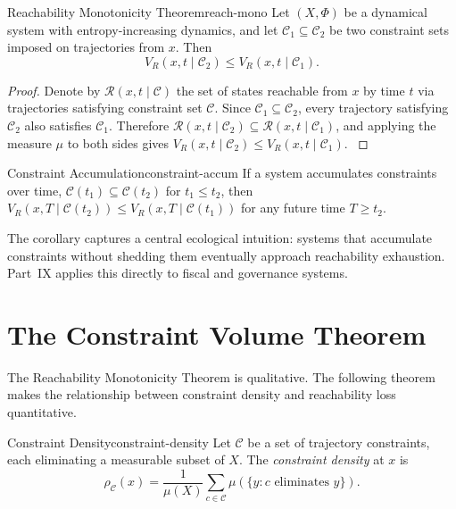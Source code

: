 \documentclass[12pt,twoside,openright]{book}
\newcommand{\reach}{\mathcal{R}}
\begin{document}
\begin{theorem}{Reachability Monotonicity Theorem}{reach-mono}
  Let $(X,\Phi)$ be a dynamical system with
  entropy-increasing dynamics, and let
  $\mathcal{C}_1\subseteq\mathcal{C}_2$ be two constraint
  sets imposed on trajectories from $x$. Then
  \[
    V_R(x,t\mid\mathcal{C}_2) \le V_R(x,t\mid\mathcal{C}_1).
  \]
\end{theorem}

\begin{proof}
  Denote by $\reach(x,t\mid\mathcal{C})$ the set of states
  reachable from $x$ by time $t$ via trajectories satisfying
  constraint set $\mathcal{C}$. Since
  $\mathcal{C}_1\subseteq\mathcal{C}_2$, every trajectory
  satisfying $\mathcal{C}_2$ also satisfies $\mathcal{C}_1$.
  Therefore
  $\reach(x,t\mid\mathcal{C}_2) \subseteq \reach(x,t\mid\mathcal{C}_1)$,
  and applying the measure $\mu$ to both sides gives
  $V_R(x,t\mid\mathcal{C}_2) \le V_R(x,t\mid\mathcal{C}_1)$.
  \parencite{sontag1998}
\end{proof}

\begin{corollary}{Constraint Accumulation}{constraint-accum}
  If a system accumulates constraints over time,
  $\mathcal{C}(t_1)\subseteq\mathcal{C}(t_2)$ for
  $t_1\le t_2$, then
  $V_R(x,T\mid\mathcal{C}(t_2)) \le V_R(x,T\mid\mathcal{C}(t_1))$
  for any future time $T\ge t_2$.
\end{corollary}

The corollary captures a central ecological intuition:
systems that accumulate constraints without shedding them
eventually approach reachability exhaustion. Part~IX
applies this directly to fiscal and governance systems.

\section{The Constraint Volume Theorem}
\label{sec:ch13-constraint-vol}

The Reachability Monotonicity Theorem is qualitative. The
following theorem makes the relationship between constraint
density and reachability loss quantitative.

\begin{definition}{Constraint Density}{constraint-density}
  Let $\mathcal{C}$ be a set of trajectory constraints, each
  eliminating a measurable subset of $X$. The
  \emph{constraint density} at $x$ is
  \[
    \rho_\mathcal{C}(x)
    = \frac{1}{\mu(X)} \sum_{c\in\mathcal{C}}
      \mu(\{y : c\text{ eliminates }y\}).
  \]
\end{definition}
\end{document}
